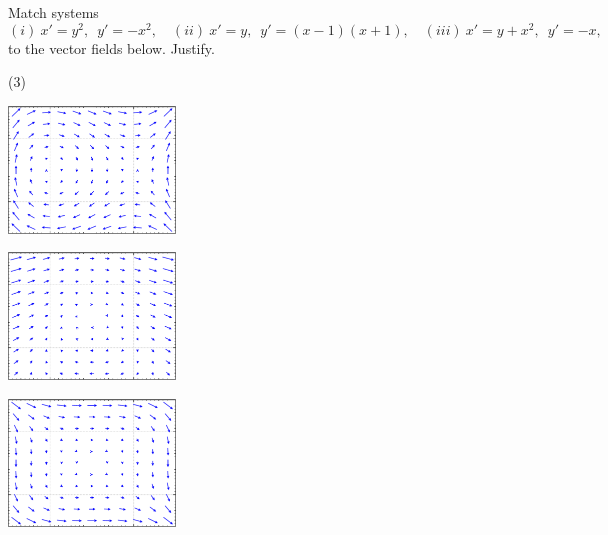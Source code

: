 \begin{exercise}\ansMark%
Match systems
\begin{equation*}
(i)\  x'=y^2, \enspace y'=-x^2, \quad (ii)\  x'=y, \enspace y'=(x-1)(x+1), \quad (iii)\  x'=y+x^2, \enspace y'=-x,
\end{equation*}
to the vector fields below.  Justify.
\begin{tasks}(3)
\task \parbox[c]{1.75in}{\includegraphics[width=1.75in]{figures/nlin-exer-y-xm1xp1}}
\task \parbox[c]{1.75in}{\includegraphics[width=1.75in]{figures/nlin-exer-ypx2-mx}}
\task \parbox[c]{1.75in}{\includegraphics[width=1.75in]{figures/nlin-exer-y2-mx2}}
\end{tasks}
\end{exercise}


